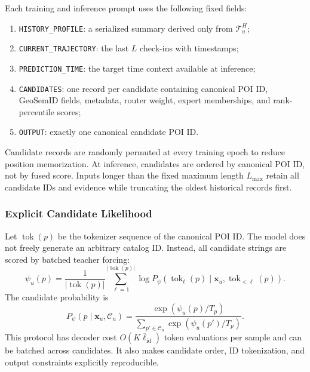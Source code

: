 \documentclass[journal]{IEEEtran}
\begin{document}
Each training and inference prompt uses the following fixed fields:
\begin{enumerate}[leftmargin=*,nosep]
\item \texttt{HISTORY\_PROFILE}: a serialized summary derived only from
$\mathcal{T}_{u}^{H}$;
\item \texttt{CURRENT\_TRAJECTORY}: the last $L$ check-ins with timestamps;
\item \texttt{PREDICTION\_TIME}: the target time context available at inference;
\item \texttt{CANDIDATES}: one record per candidate containing canonical POI
ID, GeoSemID fields, metadata, router weight, expert memberships, and
rank-percentile scores;
\item \texttt{OUTPUT}: exactly one canonical candidate POI ID.
\end{enumerate}
Candidate records are randomly permuted at every training epoch to reduce
position memorization.
At inference, candidates are ordered by canonical POI ID, not by fused score.
Inputs longer than the fixed maximum length $L_{\max}$ retain all candidate
IDs and evidence while truncating the oldest historical records first.

\subsubsection{Explicit Candidate Likelihood}

Let $\operatorname{tok}(p)$ be the tokenizer sequence of the canonical POI ID.
The model does not freely generate an arbitrary catalog ID.
Instead, all candidate strings are scored by batched teacher forcing:
\begin{equation}
\psi_u(p)
=
\frac{1}{|\operatorname{tok}(p)|}
\sum_{\ell=1}^{|\operatorname{tok}(p)|}
\log
P_{\psi}
\left(
\operatorname{tok}_{\ell}(p)
\mid
\bm{x}_u,
\operatorname{tok}_{<\ell}(p)
\right).
\label{eq:candidate_likelihood}
\end{equation}
The candidate probability is
\begin{equation}
P_{\psi}(p\mid\bm{x}_u,\mathcal{C}_u)
=
\frac{\exp(\psi_u(p)/T_p)}
{\sum_{p'\in\mathcal{C}_u}\exp(\psi_u(p')/T_p)}.
\label{eq:candidate_probability}
\end{equation}
This protocol has decoder cost
$O(K\overline{\ell}_{\mathrm{id}})$ token evaluations per sample and can be
batched across candidates.
It also makes candidate order, ID tokenization, and output constraints
explicitly reproducible.
\end{document}
